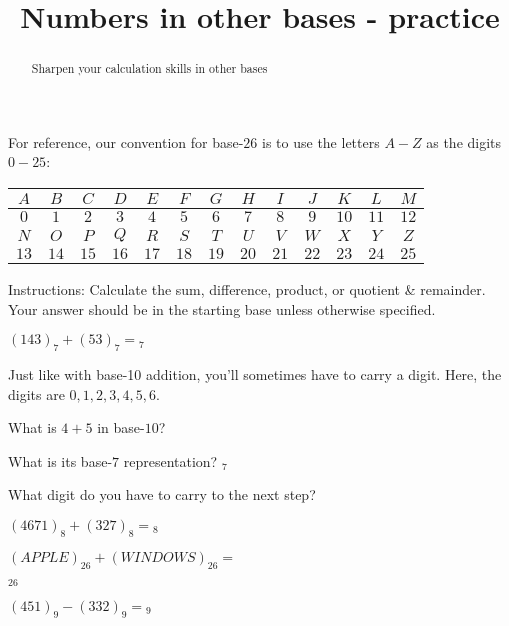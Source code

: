 \documentclass[handout,numbers]{ximera}
\title{Numbers in other bases - practice}
\begin{document}
\begin{abstract} {Sharpen your calculation skills in other bases}
\end{abstract}
\maketitle

For reference, our convention for base-$26$ is to use the letters $A-Z$ as the digits $0-25$:

\begin{center}
\begin{small}
\begin{tabular}{|c|c|c|c|c|c|c|c|c|c|c|c|c|}
\hline
 $A$ & $B$ & $C$ & $D$ & $E$ & $F$ & $G$ & $H$ & $I$ & $J$ & $K$ & $L$ & $M$  \\
 \hline
$0$ & $1$ & $2$ & $3$ & $4$ & $5$ & $6$ & $7$ & $8$ & $9$ & $10$ & $11$ & $12$ \\
\hline
\hline
$N$ & $O$ & $P$ & $Q$ & $R$ & $S$ & $T$ & $U$ & $V$ & $W$ & $X$ & $Y$ & $Z$\\
\hline
$13$ & $14$ & $15$ & $16$ & $17$ & $18$ & $19$ & $20$ & $21$ & $22$ & $23$ & $24$ & $25$ \\
\hline
\end{tabular}
\end{small}
\end{center}

Instructions: Calculate the sum, difference, product, or quotient \& remainder.  Your answer should be in the starting base unless otherwise specified.

\begin{question}
$(143)_7 + (53)_7 = $$_7$

\begin{hint} Just like with base-10 addition, you'll sometimes have to carry a digit.  Here, the digits are $0, 1, 2, 3, 4, 5, 6$.

\begin{prompt} What is $4+5$ in base-$10$? \end{prompt}

\begin{prompt} What is its base-$7$ representation? $_7$\end{prompt}

\begin{prompt} What digit do you have to carry to the next step? 
\end{prompt}
\end{hint}


\end{question}

\begin{question} $(4671)_8 + (327)_8 = $$_8$
\end{question}

\begin{question} $(APPLE)_{26}+(WINDOWS)_{26} = $

$_{26}$
\end{question}

\begin{question} $(451)_9 - (332)_9 = $$_9$

\end{question}
\end{document}
